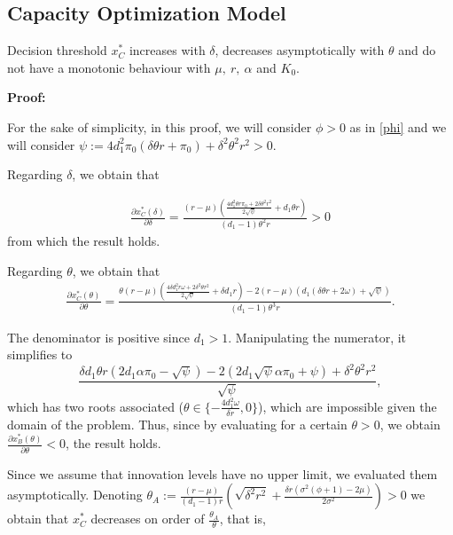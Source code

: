 \subsection{Capacity Optimization Model}
\label{2_com}


\begin{prop}
	\label{3_prop2}
Decision threshold $x^*_C$ increases with $\delta$, decreases asymptotically with $\theta$ and do not have a monotonic behaviour with $\mu, \ r, \  \alpha$ and $K_0$.
\end{prop}

\textbf{Proof:}

For the sake of simplicity, in this proof, we will consider $\phi>0$ as in \eqref{phi} and we will consider
$\psi:=4 d_1^2 \pi_0  (\delta  \theta  r+\pi_0 )+\delta ^2 \theta ^2 r^2>0$.

Regarding $\delta$, we obtain that

\begin{align*}
\frac{\partial x^*_C ( \delta ) }{\partial \delta}= \frac{(r-\mu ) \left(\frac{4 d_1^2 \theta  r \pi_0 +2 \delta  \theta ^2 r^2}{2 \sqrt{\psi }}+d_1 \theta  r\right)}{(d_1-1) \theta ^2 r}>0
\end{align*}
from which the result holds.

Regarding $\theta$, we obtain that
\begin{align*}
\frac{\partial x^*_C ( \theta) }{\partial \theta}= \frac{ \theta (r-\mu ) \left(\frac{4 \delta  d_1^2 r \omega +2 \delta ^2 \theta  r^2}{2 \sqrt{\psi }}+\delta  d_1 r\right)- 2 (r-\mu ) \left(d_1 (\delta  \theta  r+2 \omega )+\sqrt{\psi }\right)}{(d_1-1) \theta ^3 r}.
\end{align*}

The denominator is positive since $d_1>1$.
Manipulating the numerator, it simplifies to
$$ \frac{\delta  d_1 \theta  r \left(2 d_1 \alpha \pi_0 -\sqrt{\psi }\right)-2 \left(2 d_1 \sqrt{\psi } \alpha \pi_0 +\psi \right)+\delta ^2 \theta ^2 r^2}{\sqrt{\psi} },$$
which has two roots associated ($\theta \in \{ -\frac{4 d_1^2 \omega }{\delta  r}, 0 \}$), which are impossible given the domain of the problem.
Thus, since by evaluating for a certain $\theta>0$, we obtain $\frac{\partial x^*_B ( \theta) }{\partial \theta}<0$, the result holds.


Since we assume that innovation levels have no upper limit, we evaluated them asymptotically. Denoting $\theta_A:=\frac{(r-\mu )}{(d_1-1) r}  \left(\sqrt{\delta ^2 r^2}+\frac{\delta  r \left(\sigma ^2 (\phi +1)-2 \mu \right)}{2 \sigma ^2}\right)>0$ we obtain that $x^*_C$ decreases on order of $\frac{\theta_A}{\theta}$, that is,  


